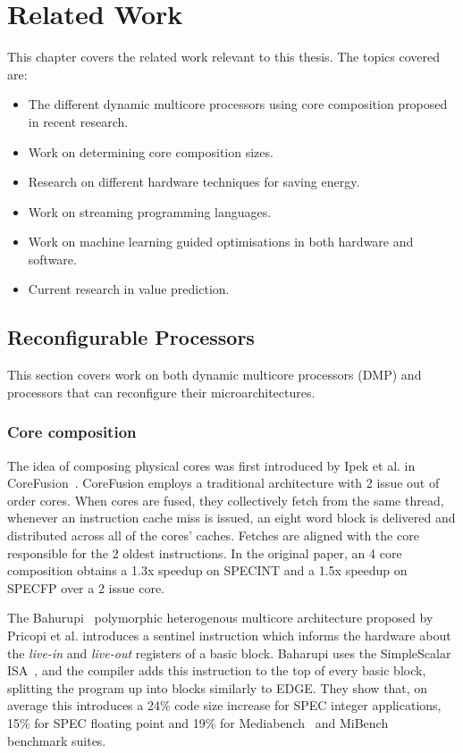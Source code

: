 \chapter{Related Work}
This chapter covers the related work relevant to this thesis.
The topics covered are:
\begin{itemize}
\item The different dynamic multicore processors using core composition proposed in recent research.
\vspace{-1em}
\item Work on determining core composition sizes.
\vspace{-1em}
\item Research on different hardware techniques for saving energy.
\vspace{-1em}
\item Work on streaming programming languages.
\vspace{-1em}
\item Work on machine learning guided optimisations in both hardware and software.
\vspace{-1em}
\item Current research in value prediction.
\end{itemize}

\section{Reconfigurable Processors}

This section covers work on both dynamic multicore processors (DMP) and processors that can reconfigure their microarchitectures.

\subsection{Core composition}
The idea of composing physical cores was first introduced by Ipek et al. in CoreFusion~\cite{ipek2007CoreFusion}.
CoreFusion employs a traditional architecture with 2 issue out of order cores.
When cores are fused, they collectively fetch from the same thread, whenever an instruction cache miss is issued, an eight word block is delivered and distributed across all of the cores' caches.
Fetches are aligned with the core responsible for the 2 oldest instructions.
In the original paper, an 4 core composition obtains a 1.3x speedup on SPECINT and a 1.5x speedup on SPECFP over a 2 issue core.
 
The Bahurupi~\cite{pricopi2012bahurupi} polymorphic heterogenous multicore architecture proposed by Pricopi et al. introduces a sentinel instruction which informs the hardware about the \textit{live-in} and \textit{live-out} registers of a basic block.
Baharupi uses the SimpleScalar ISA~\cite{burger1997simplescalar}, and the compiler adds this instruction to the top of every basic block, splitting the program up into blocks similarly to EDGE.
They show that, on average this introduces a 24\% code size increase for SPEC integer applications, 15\% for SPEC floating point and 19\% for Mediabench~\cite{mediabench} and MiBench~\cite{mibench} benchmark suites.

